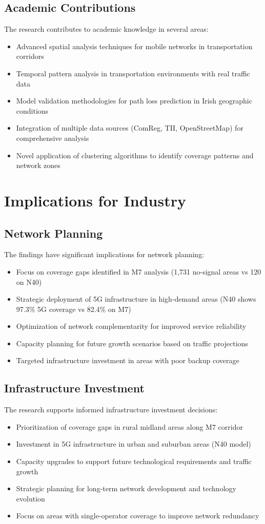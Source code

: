 \documentclass[MScCS]{uccthesis}
\begin{document}
\subsection{Academic Contributions}
The research contributes to academic knowledge in several areas:
\begin{itemize}
\item Advanced spatial analysis techniques for mobile networks in transportation corridors
\item Temporal pattern analysis in transportation environments with real traffic data
\item Model validation methodologies for path loss prediction in Irish geographic conditions
\item Integration of multiple data sources (ComReg, TII, OpenStreetMap) for comprehensive analysis
\item Novel application of clustering algorithms to identify coverage patterns and network zones
\end{itemize}

\section{Implications for Industry}

\subsection{Network Planning}
The findings have significant implications for network planning:
\begin{itemize}
\item Focus on  coverage gaps identified in M7 analysis (1,731 no-signal areas vs 120 on N40)
\item Strategic deployment of 5G infrastructure in high-demand areas (N40 shows 97.3\% 5G coverage vs 82.4\% on M7)
\item Optimization of network complementarity for improved service reliability
\item Capacity planning for future growth scenarios based on traffic projections
\item Targeted infrastructure investment in areas with poor backup coverage
\end{itemize}

\subsection{Infrastructure Investment}
The research supports informed infrastructure investment decisions:
\begin{itemize}
\item Prioritization of coverage gaps in rural midland areas along M7 corridor
\item Investment in 5G infrastructure in urban and suburban areas (N40 model)
\item Capacity upgrades to support future technological requirements and traffic growth
\item Strategic planning for long-term network development and technology evolution
\item Focus on areas with single-operator coverage to improve network redundancy
\end{itemize}
\end{document}
